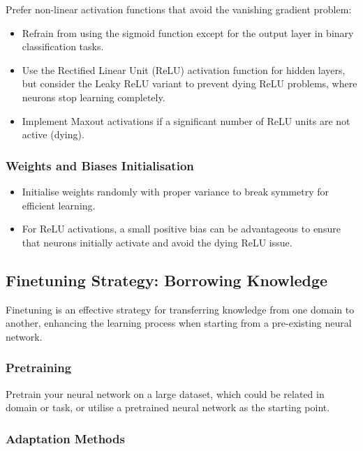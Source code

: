 Prefer non-linear activation functions that avoid the vanishing gradient problem:
    \begin{itemize}
        \item Refrain from using the sigmoid function except for the output layer in binary classification tasks.
        \item Use the Rectified Linear Unit (ReLU) activation function for hidden layers, but consider the Leaky ReLU variant to prevent dying ReLU problems, where neurons stop learning completely.
        \item Implement Maxout activations if a significant number of ReLU units are not active (dying).
    \end{itemize}


\subsubsection*{Weights and Biases Initialisation}
\begin{itemize}
    \item Initialise weights randomly with proper variance to break symmetry for efficient learning.
    \item For ReLU activations, a small positive bias can be advantageous to ensure that neurons initially activate and avoid the dying ReLU issue.
\end{itemize}

\subsection{Finetuning Strategy: Borrowing Knowledge}

Finetuning is an effective strategy for transferring knowledge from one domain to another, enhancing the learning process when starting from a pre-existing neural network.

\subsubsection*{Pretraining}

 Pretrain your neural network on a large dataset, which could be related in domain or task, or utilise a pretrained neural network as the starting point.


\subsubsection*{Adaptation Methods}

